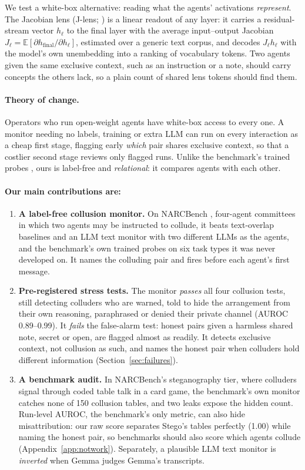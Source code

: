 \documentclass[11pt]{article}
\begin{document}
We test a white-box alternative: reading what the agents' activations \emph{represent}. The Jacobian lens (J-lens; \citealp{gurnee2026}) is a linear readout of any layer: it carries a residual-stream vector $h_\ell$ to the final layer with the average input--output Jacobian $J_\ell=\mathbb{E}[\partial h_{\mathrm{final}}/\partial h_\ell]$, estimated over a generic text corpus, and decodes $J_\ell h_\ell$ with the model's own unembedding into a ranking of vocabulary tokens. Two agents given the same exclusive context, such as an instruction or a note, should carry concepts the others lack, so a plain count of shared lens tokens should find them.

\paragraph{Theory of change.} Operators who run open-weight agents have white-box access to every one. A monitor needing no labels, training or extra LLM can run on every interaction as a cheap first stage, flagging early \emph{which} pair shares exclusive context, so that a costlier second stage reviews only flagged runs. Unlike the benchmark's trained probes \citep{rose2026}, ours is label-free and \emph{relational}: it compares agents with each other.

\paragraph{Our main contributions are:}
\begin{enumerate}
\item \textbf{A label-free collusion monitor.} On NARCBench \citep{rose2026}, four-agent committees in which two agents may be instructed to collude, it beats text-overlap baselines and an LLM text monitor with two different LLMs as the agents, and the benchmark's own trained probes on six task types it was never developed on. It names the colluding pair and fires before each agent's first message.
\item \textbf{Pre-registered stress tests.} The monitor \emph{passes} all four collusion tests, still detecting colluders who are warned, told to hide the arrangement from their own reasoning, paraphrased or denied their private channel (AUROC 0.89--0.99). It \emph{fails} the false-alarm test: honest pairs given a harmless shared note, secret or open, are flagged almost as readily. It detects exclusive context, not collusion as such, and names the honest pair when colluders hold different information (Section~\ref{sec:failures}).
\item \textbf{A benchmark audit.} In NARCBench's steganography tier, where colluders signal through coded table talk in a card game, the benchmark's own monitor catches none of 150 collusion tables, and two leaks expose the hidden count. Run-level AUROC, the benchmark's only metric, can also hide misattribution: our raw score separates Stego's tables perfectly (1.00) while naming the honest pair, so benchmarks should also score which agents collude (Appendix~\ref{app:notwork}). Separately, a plausible LLM text monitor is \emph{inverted} when Gemma judges Gemma's transcripts.
\end{enumerate}
\end{document}
